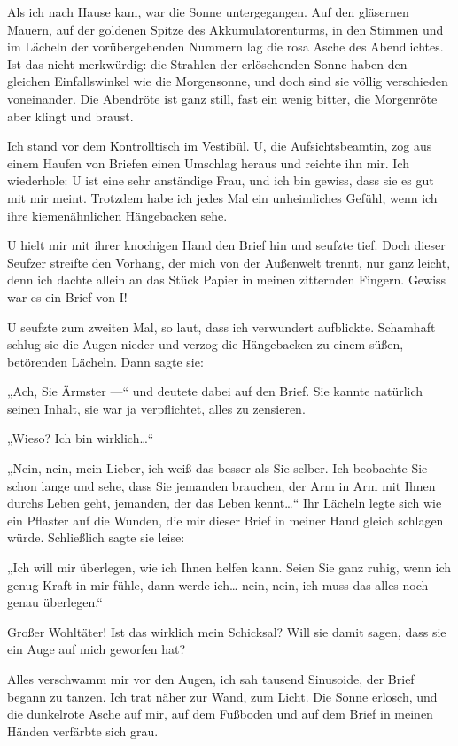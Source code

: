 Als ich nach Hause kam, war die Sonne
untergegangen. Auf den gläsernen Mauern, auf der goldenen Spitze
des Akkumulatorenturms, in den Stimmen und im Lächeln der
vorübergehenden Nummern lag die rosa Asche des Abendlichtes. Ist
das nicht merkwürdig: die Strahlen der erlöschenden Sonne haben den
gleichen Einfallswinkel wie die Morgensonne, und doch sind sie
völlig verschieden voneinander. Die Abendröte ist ganz still, fast
ein wenig bitter, die Morgenröte aber klingt und braust.

Ich stand
vor dem Kontrolltisch im Vestibül. U, die Aufsichtsbeamtin, zog aus
einem Haufen von Briefen einen Umschlag heraus und reichte ihn mir.
Ich wiederhole: U ist eine sehr anständige Frau, und ich bin
gewiss, dass sie es gut mit mir meint. Trotzdem habe ich jedes Mal
ein unheimliches Gefühl, wenn ich ihre kiemenähnlichen Hängebacken
sehe.

U hielt mir mit ihrer knochigen Hand den Brief hin und seufzte
tief. Doch dieser Seufzer streifte den Vorhang, der mich von der
Außenwelt trennt, nur ganz leicht, denn
ich dachte allein an das Stück Papier in meinen zitternden Fingern.
Gewiss war es ein Brief von I!

U seufzte zum zweiten Mal, so laut,
dass ich verwundert aufblickte. Schamhaft schlug sie die Augen
nieder und verzog die Hängebacken zu einem süßen, betörenden
Lächeln. Dann sagte sie:

„Ach, Sie Ärmster —“ und deutete dabei auf den Brief. Sie kannte
natürlich seinen Inhalt, sie war ja verpflichtet, alles zu
zensieren.

„Wieso? Ich bin wirklich\ldots{}“

„Nein, nein, mein Lieber, ich weiß das besser als Sie selber. Ich
beobachte Sie schon lange und sehe, dass Sie jemanden brauchen, der
Arm in Arm mit Ihnen durchs Leben geht, jemanden, der das Leben
kennt\ldots{}“ Ihr Lächeln legte sich wie ein Pflaster auf die Wunden,
die mir dieser Brief in meiner Hand gleich schlagen würde.
Schließlich sagte sie leise:

„Ich will mir überlegen, wie ich Ihnen helfen kann. Seien Sie ganz
ruhig, wenn ich genug Kraft in mir fühle, dann werde ich\ldots{} nein,
nein, ich muss das alles noch genau überlegen.“

Großer Wohltäter! Ist das wirklich mein Schicksal? Will sie damit
sagen, dass sie ein Auge auf mich geworfen hat?

Alles verschwamm mir vor den Augen, ich sah tausend Sinusoide, der
Brief begann zu tanzen. Ich trat näher zur Wand, zum Licht. Die
Sonne erlosch, und die dunkelrote Asche auf mir, auf dem Fußboden
und auf dem Brief in meinen Händen verfärbte sich grau.

